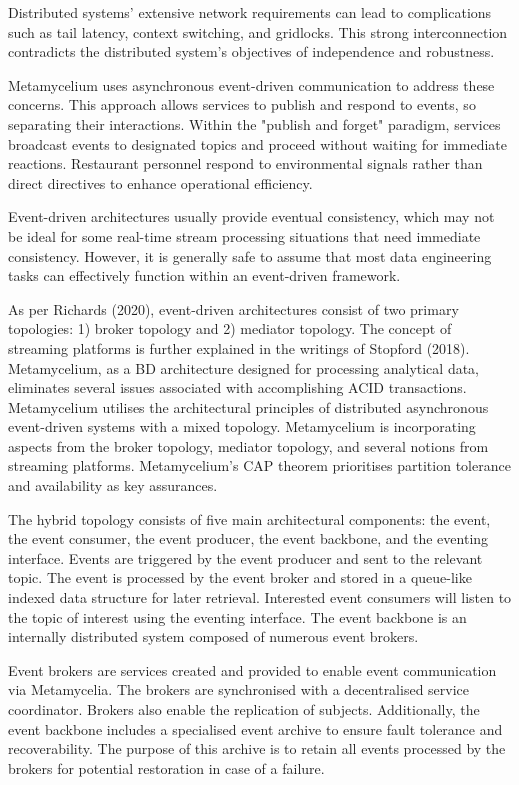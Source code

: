 \documentclass[journal]{IEEEtran}
\begin{document}
Distributed systems' extensive network requirements can lead to complications such as tail latency, context switching, and gridlocks. This strong interconnection contradicts the distributed system's objectives of independence and robustness.

Metamycelium uses asynchronous event-driven communication to address these concerns. This approach allows services to publish and respond to events, so separating their interactions. Within the "publish and forget" paradigm, services broadcast events to designated topics and proceed without waiting for immediate reactions. Restaurant personnel respond to environmental signals rather than direct directives to enhance operational efficiency.

Event-driven architectures usually provide eventual consistency, which may not be ideal for some real-time stream processing situations that need immediate consistency. However, it is generally safe to assume that most data engineering tasks can effectively function within an event-driven framework.

As per Richards (2020), event-driven architectures consist of two primary topologies: 1) broker topology and 2) mediator topology. The concept of streaming platforms is further explained in the writings of Stopford (2018). Metamycelium, as a BD architecture designed for processing analytical data, eliminates several issues associated with accomplishing ACID transactions. Metamycelium utilises the architectural principles of distributed asynchronous event-driven systems with a mixed topology. Metamycelium is incorporating aspects from the broker topology, mediator topology, and several notions from streaming platforms. Metamycelium's CAP theorem prioritises partition tolerance and availability as key assurances. 

The hybrid topology consists of five main architectural components: the event, the event consumer, the event producer, the event backbone, and the eventing interface. Events are triggered by the event producer and sent to the relevant topic. The event is processed by the event broker and stored in a queue-like indexed data structure for later retrieval. Interested event consumers will listen to the topic of interest using the eventing interface. The event backbone is an internally distributed system composed of numerous event brokers. 

Event brokers are services created and provided to enable event communication via Metamycelia. The brokers are synchronised with a decentralised service coordinator. Brokers also enable the replication of subjects. Additionally, the event backbone includes a specialised event archive to ensure fault tolerance and recoverability. The purpose of this archive is to retain all events processed by the brokers for potential restoration in case of a failure. 
\end{document}
